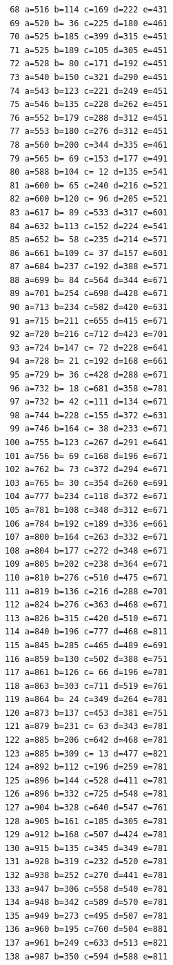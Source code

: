 \documentclass[11pt]{article}
\begin{document}
\begin{lstlisting}
 68 a=516 b=114 c=169 d=222 e=431
 69 a=520 b= 36 c=225 d=180 e=461
 70 a=525 b=185 c=399 d=315 e=451
 71 a=525 b=189 c=105 d=305 e=451
 72 a=528 b= 80 c=171 d=192 e=451
 73 a=540 b=150 c=321 d=290 e=451
 74 a=543 b=123 c=221 d=249 e=451
 75 a=546 b=135 c=228 d=262 e=451
 76 a=552 b=179 c=288 d=312 e=451
 77 a=553 b=180 c=276 d=312 e=451
 78 a=560 b=200 c=344 d=335 e=461
 79 a=565 b= 69 c=153 d=177 e=491
 80 a=588 b=104 c= 12 d=135 e=541
 81 a=600 b= 65 c=240 d=216 e=521
 82 a=600 b=120 c= 96 d=205 e=521
 83 a=617 b= 89 c=533 d=317 e=601
 84 a=632 b=113 c=152 d=224 e=541
 85 a=652 b= 58 c=235 d=214 e=571
 86 a=661 b=109 c= 37 d=157 e=601
 87 a=684 b=237 c=192 d=388 e=571
 88 a=699 b= 84 c=564 d=344 e=671
 89 a=701 b=254 c=698 d=428 e=671
 90 a=713 b=234 c=582 d=420 e=631
 91 a=715 b=211 c=655 d=415 e=671
 92 a=720 b=216 c=712 d=423 e=701
 93 a=724 b=147 c= 72 d=228 e=641
 94 a=728 b= 21 c=192 d=168 e=661
 95 a=729 b= 36 c=428 d=288 e=671
 96 a=732 b= 18 c=681 d=358 e=781
 97 a=732 b= 42 c=111 d=134 e=671
 98 a=744 b=228 c=155 d=372 e=631
 99 a=746 b=164 c= 38 d=233 e=671
100 a=755 b=123 c=267 d=291 e=641
101 a=756 b= 69 c=168 d=196 e=671
102 a=762 b= 73 c=372 d=294 e=671
103 a=765 b= 30 c=354 d=260 e=691
104 a=777 b=234 c=118 d=372 e=671
105 a=781 b=108 c=348 d=312 e=671
106 a=784 b=192 c=189 d=336 e=661
107 a=800 b=164 c=263 d=332 e=671
108 a=804 b=177 c=272 d=348 e=671
109 a=805 b=202 c=238 d=364 e=671
110 a=810 b=276 c=510 d=475 e=671
111 a=819 b=136 c=216 d=288 e=701
112 a=824 b=276 c=363 d=468 e=671
113 a=826 b=315 c=420 d=510 e=671
114 a=840 b=196 c=777 d=468 e=811
115 a=845 b=285 c=465 d=489 e=691
116 a=859 b=130 c=502 d=388 e=751
117 a=861 b=126 c= 66 d=196 e=781
118 a=863 b=303 c=711 d=519 e=761
119 a=864 b= 24 c=349 d=264 e=781
120 a=873 b=137 c=453 d=381 e=751
121 a=879 b=231 c= 63 d=343 e=781
122 a=885 b=206 c=642 d=468 e=781
123 a=885 b=309 c= 13 d=477 e=821
124 a=892 b=112 c=196 d=259 e=781
125 a=896 b=144 c=528 d=411 e=781
126 a=896 b=332 c=725 d=548 e=781
127 a=904 b=328 c=640 d=547 e=761
128 a=905 b=161 c=185 d=305 e=781
129 a=912 b=168 c=507 d=424 e=781
130 a=915 b=135 c=345 d=349 e=781
131 a=928 b=319 c=232 d=520 e=781
132 a=938 b=252 c=270 d=441 e=781
133 a=947 b=306 c=558 d=540 e=781
134 a=948 b=342 c=589 d=570 e=781
135 a=949 b=273 c=495 d=507 e=781
136 a=960 b=195 c=760 d=504 e=881
137 a=961 b=249 c=633 d=513 e=821
138 a=987 b=350 c=594 d=588 e=811
\end{lstlisting}
\end{document}
